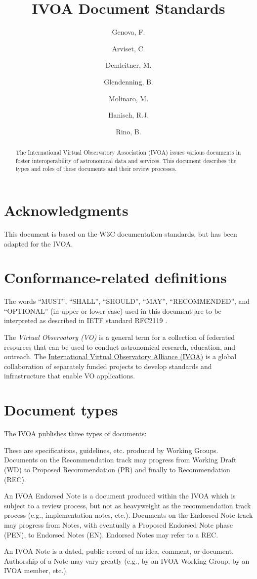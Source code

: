 \documentclass[11pt,a4paper]{ivoa}
\title{IVOA Document Standards}
\author{Genova, F.}
\author{Arviset, C.}
\author{Demleitner, M.}
\author{Glendenning, B.}
\author{Molinaro, M.}
\author{Hanisch, R.J.}
\author{Rino, B.}
\begin{document}
\begin{abstract}
The International Virtual Observatory Association (IVOA) issues various
documents in foster interoperability of astronomical data and services.
This document describes the types and roles of these documents and
their review processes.
\end{abstract}


\section*{Acknowledgments}

This document is based on the W3C documentation standards, but has been
adapted for the IVOA.

\section*{Conformance-related definitions}

The words ``MUST'', ``SHALL'', ``SHOULD'', ``MAY'', ``RECOMMENDED'', and
``OPTIONAL'' (in upper or lower case) used in this document are to be
interpreted as described in IETF standard RFC2119 \citep{std:RFC2119}.

The \emph{Virtual Observatory (VO)} is a
general term for a collection of federated resources that can be used
to conduct astronomical research, education, and outreach.
The \href{https://www.ivoa.net}{International
Virtual Observatory Alliance (IVOA)} is a global
collaboration of separately funded projects to develop standards and
infrastructure that enable VO applications.


\section{Document types}
\label{sect:doctypes}

The IVOA publishes three types of documents:

\begin{bigdescription}
\item[Recommendation track documents]  These are specifications, guidelines,
etc.  produced by Working Groups. Documents on the Recommendation track
may progress from Working Draft (WD) to Proposed Recommendation (PR) and
finally to Recommendation (REC).

\item[Endorsed Notes track documents] An IVOA Endorsed Note is a document
produced within the IVOA which is subject to a review process, but not
as heavyweight as the recommendation track process (e.g., implementation
notes, etc.). Documents on the Endorsed Note track may progress from
Notes, with eventually a Proposed Endorsed Note phase (PEN), to Endorsed
Notes (EN). Endorsed Notes may refer to a REC.

\item[IVOA Notes]  An IVOA Note is a dated, public record of an idea, comment,
or document.  Authorship of a Note may vary greatly (e.g., by an IVOA
Working Group, by an IVOA member, etc.).
\end{bigdescription}
\end{document}
